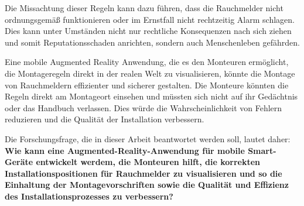 Die Missachtung dieser Regeln kann dazu führen, dass die Rauchmelder nicht ordnungsgemäß funktionieren oder im Ernstfall nicht rechtzeitig Alarm schlagen. Dies kann unter Umständen nicht nur rechtliche Konsequenzen nach sich ziehen und somit Reputationsschaden anrichten, sondern auch Menschenleben gefährden.

Eine mobile Augmented Reality Anwendung, die es den Monteuren ermöglicht, die Montageregeln direkt in der realen Welt zu visualisieren, könnte die Montage von Rauchmeldern effizienter und sicherer gestalten. Die Monteure könnten die Regeln direkt am Montageort einsehen und müssten sich nicht auf ihr Gedächtnis oder das Handbuch verlassen. Dies würde die Wahrscheinlichkeit von Fehlern reduzieren und die Qualität der Installation verbessern.

Die Forschungsfrage, die in dieser Arbeit beantwortet werden soll, lautet daher: \textbf{Wie kann eine Augmented-Reality-Anwendung für mobile Smart-Geräte entwickelt werdem, die Monteuren hilft, die korrekten Installationspositionen für Rauchmelder zu visualisieren und so die Einhaltung der Montagevorschriften sowie die Qualität und Effizienz des Installationsprozesses zu verbessern?}

